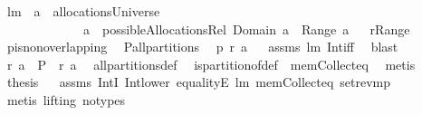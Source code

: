 \begin{isabellebody}
%
\isadelimproof
\isanewline
%
\endisadelimproof
\isanewline
{}\isamarkupfalse%
\ lm{}{}{\isacharcolon}\ \ {\isachardoublequoteopen}a\ {\isasymin}\ allocationsUniverse{\isachardoublequoteclose}\ \isanewline
\ \ \ \ \ \ \ \ \ \ \ \ \ {\isachardoublequoteopen}a\ {\isasymin}\ possibleAllocationsRel\ {\isacharparenleft}Domain\ a{\isacharparenright}\ {\isacharparenleft}{\isasymUnion}\ {\isacharparenleft}Range\ a{\isacharparenright}{\isacharparenright}{\isachardoublequoteclose}\isanewline
%
\isadelimproof
%
\endisadelimproof
%
\isatagproof
{}\isamarkupfalse%
\ {\isacharminus}\isanewline
{}\isamarkupfalse%
\ {\isacharquery}r{\isacharequal}Range\ \isamarkupfalse%
\ {\isacharquery}p{\isacharequal}is{\isacharunderscore}non{\isacharunderscore}overlapping\ \isamarkupfalse%
\ {\isacharquery}P{\isacharequal}all{\isacharunderscore}partitions\ \isamarkupfalse%
\ {\isachardoublequoteopen}{\isacharquery}p\ {\isacharparenleft}{\isacharquery}r\ a{\isacharparenright}{\isachardoublequoteclose}\ \isamarkupfalse%
\ \isanewline
assms\ lm{}{}\ Int{\isacharunderscore}iff\ \isamarkupfalse%
\ blast\ \isamarkupfalse%
\ \isamarkupfalse%
\ {\isachardoublequoteopen}{\isacharquery}r\ a\ {\isasymin}\ {\isacharquery}P\ {\isacharparenleft}{\isasymUnion}\ {\isacharparenleft}{\isacharquery}r\ a{\isacharparenright}{\isacharparenright}{\isachardoublequoteclose}\ \isamarkupfalse%
\ all{\isacharunderscore}partitions{\isacharunderscore}def\ \isanewline
{}\isamarkupfalse%
\ is{\isacharunderscore}partition{\isacharunderscore}of{\isacharunderscore}def\ \ mem{\isacharunderscore}Collect{\isacharunderscore}eq\ \isamarkupfalse%
\ {\isacharparenleft}metis{\isacharparenright}\ \isamarkupfalse%
\ \isamarkupfalse%
\ {\isacharquery}thesis\ \isamarkupfalse%
\ \isanewline
assms\ IntI\ Int{\isacharunderscore}lower{}\ equalityE\ lm{}{}\ mem{\isacharunderscore}Collect{\isacharunderscore}eq\ set{\isacharunderscore}rev{\isacharunderscore}mp\ \isamarkupfalse%
\ {\isacharparenleft}metis\ {\isacharparenleft}lifting{\isacharcomma}\ no{\isacharunderscore}types{\isacharparenright}{\isacharparenright}\isanewline
{}\isamarkupfalse%
%
\endisatagproof
{\isafoldproof}%
%
\isadelimproof
\isanewline
%
\endisadelimproof

\end{isabellebody}
